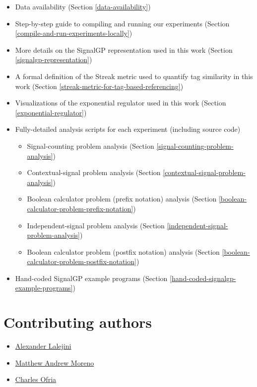 \documentclass[]{book}
\providecommand{\tightlist}{%
  \setlength{\itemsep}{0pt}\setlength{\parskip}{0pt}}
\begin{document}
\begin{itemize}
\tightlist
\item
  Data availability (Section \ref{data-availability})
\item
  Step-by-step guide to compiling and running our experiments (Section \ref{compile-and-run-experiments-locally})
\item
  More details on the SignalGP representation used in this work (Section \ref{signalgp-representation})
\item
  A formal definition of the Streak metric used to quantify tag similarity in this work (Section \ref{streak-metric-for-tag-based-referencing})
\item
  Visualizations of the exponential regulator used in this work (Section \ref{exponential-regulator})
\item
  Fully-detailed analysis scripts for each experiment (including source code)

  \begin{itemize}
  \tightlist
  \item
    Signal-counting problem analysis (Section \ref{signal-counting-problem-analysis})
  \item
    Contextual-signal problem analysis (Section \ref{contextual-signal-problem-analysis})
  \item
    Boolean calculator problem (prefix notation) analysis (Section \ref{boolean-calculator-problem-prefix-notation})
  \item
    Independent-signal problem analysis (Section \ref{independent-signal-problem-analysis})
  \item
    Boolean calculator problem (postfix notation) analysis (Section \ref{boolean-calculator-problem-postfix-notation})
  \end{itemize}
\item
  Hand-coded SignalGP example programs (Section \ref{hand-coded-signalgp-example-programs})
\end{itemize}

\hypertarget{contributing-authors}{%
\section{Contributing authors}\label{contributing-authors}}

\begin{itemize}
\tightlist
\item
  \href{https://lalejini.com/}{Alexander Lalejini}
\item
  \href{http://mmore500.com/}{Matthew Andrew Moreno}
\item
  \href{https://ofria.com/}{Charles Ofria}
\end{itemize}
\end{document}
